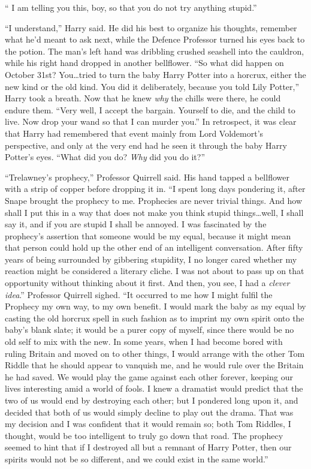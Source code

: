 “ I am telling you this, boy, so that you do not
try anything stupid.”

“I understand,” Harry said. He did his best to organize his thoughts, remember
what he’d meant to ask next, while the Defence Professor turned his eyes back
to the potion. The man’s left hand was dribbling crushed seashell into the
cauldron, while his right hand dropped in another bellflower. “So what did
happen on October 31st? You…tried to turn the baby Harry Potter into a
horcrux, either the new kind or the old kind. You did it deliberately, because
you told Lily Potter,” Harry took a breath. Now that he knew \emph{why} the
chills were there, he could endure them. “Very well, I accept the bargain.
Yourself to die, and the child to live. Now drop your wand so that I can murder
you.” In retrospect, it was clear that Harry had remembered that event mainly
from Lord Voldemort’s perspective, and only at the very end had he seen it
through the baby Harry Potter’s eyes. “What did you do? \emph{Why} did you do
it?”

“Trelawney’s prophecy,” Professor Quirrell said. His hand tapped a bellflower
with a strip of copper before dropping it in. “I spent long days pondering it,
after Snape brought the prophecy to me. Prophecies are never trivial things.
And how shall I put this in a way that does not make you think stupid
things…well, I shall say it, and if you are stupid I shall be annoyed.
I was fascinated by the prophecy’s assertion that someone would be my equal,
because it might mean that person could hold up the other end of an intelligent
conversation. After fifty years of being surrounded by gibbering stupidity, I
no longer cared whether my reaction might be considered a literary cliche. I
was not about to pass up on that opportunity without thinking about it first.
And then, you see, I had a \emph{clever idea}.” Professor Quirrell sighed. “It
occurred to me how I might fulfil the Prophecy my own way, to my own benefit.
I would mark the baby as my equal by casting the old horcrux spell in such
fashion as to imprint my own spirit onto the baby’s blank slate; it would be a
purer copy of myself, since there would be no old self to mix with the new. In
some years, when I had become bored with ruling Britain and moved on to other
things, I would arrange with the other Tom Riddle that he should appear to
vanquish me, and he would rule over the Britain he had saved. We would play the
game against each other forever, keeping our lives interesting amid a world of
fools. I knew a dramatist would predict that the two of us would end by
destroying each other; but I pondered long upon it, and decided that both of us
would simply decline to play out the drama. That was my decision and I was
confident that it would remain so; both Tom Riddles, I thought, would be too
intelligent to truly go down that road. The prophecy seemed to hint that if I
destroyed all but a remnant of Harry Potter, then our spirits would not be so
different, and we could exist in the same world.”

